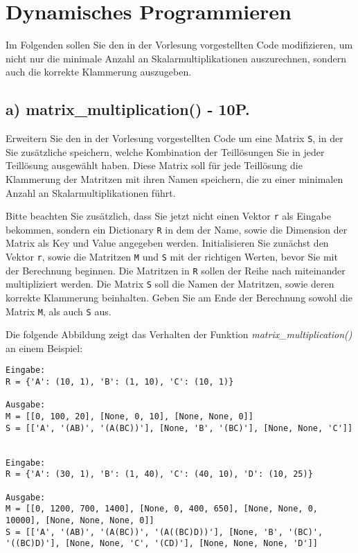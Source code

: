 \documentclass[11pt]{article}
\begin{document}
    \hypertarget{dynamisches-programmieren}{%
\section{Dynamisches Programmieren}\label{dynamisches-programmieren}}

Im Folgenden sollen Sie den in der Vorlesung vorgestellten Code
modifizieren, um nicht nur die minimale Anzahl an Skalarmultiplikationen
auszurechnen, sondern auch die korrekte Klammerung auszugeben.

    \hypertarget{a-matrix_multiplication---10p.}{%
\subsection{a) matrix\_multiplication() -
10P.}\label{a-matrix_multiplication---10p.}}

Erweitern Sie den in der Vorlesung vorgestellten Code um eine Matrix
\texttt{S}, in der Sie zusätzliche speichern, welche Kombination der
Teillösungen Sie in jeder Teillösung ausgewählt haben. Diese Matrix soll
für jede Teillösung die Klammerung der Matritzen mit ihren Namen
speichern, die zu einer minimalen Anzahl an Skalarmultiplikationen
führt.

Bitte beachten Sie zusätzlich, dass Sie jetzt nicht einen Vektor
\texttt{r} als Eingabe bekommen, sondern ein Dictionary \texttt{R} in
dem der Name, sowie die Dimension der Matrix als Key und Value angegeben
werden. Initialisieren Sie zunächst den Vektor \texttt{r}, sowie die
Matritzen \texttt{M} und \texttt{S} mit der richtigen Werten, bevor Sie
mit der Berechnung beginnen. Die Matritzen in \texttt{R} sollen der
Reihe nach miteinander multipliziert werden. Die Matrix \texttt{S} soll
die Namen der Matritzen, sowie deren korrekte Klammerung beinhalten.
Geben Sie am Ende der Berechnung sowohl die Matrix \texttt{M}, als auch
\texttt{S} aus.

Die folgende Abbildung zeigt das Verhalten der Funktion
\emph{matrix\_multiplication()} an einem Beispiel:

\begin{verbatim}
Eingabe:
R = {'A': (10, 1), 'B': (1, 10), 'C': (10, 1)}

Ausgabe:
M = [[0, 100, 20], [None, 0, 10], [None, None, 0]]
S = [['A', '(AB)', '(A(BC))'], [None, 'B', '(BC)'], [None, None, 'C']]


Eingabe:
R = {'A': (30, 1), 'B': (1, 40), 'C': (40, 10), 'D': (10, 25)}

Ausgabe:
M = [[0, 1200, 700, 1400], [None, 0, 400, 650], [None, None, 0, 10000], [None, None, None, 0]]
S = [['A', '(AB)', '(A(BC))', '(A((BC)D))'], [None, 'B', '(BC)', '((BC)D)'], [None, None, 'C', '(CD)'], [None, None, None, 'D']]
\end{verbatim}
\end{document}
